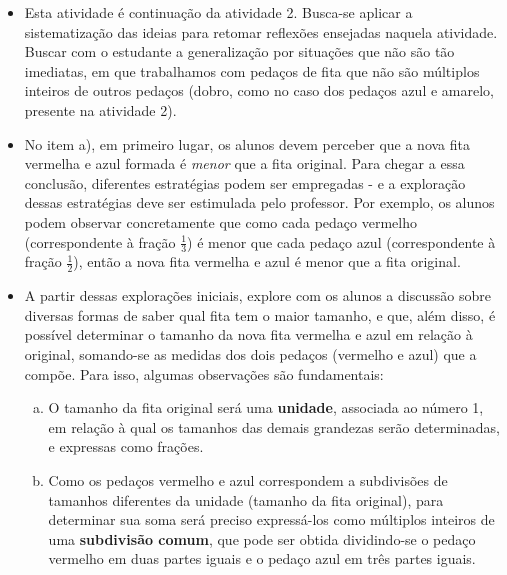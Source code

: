 \begin{multicols}{2}
 \vspace{.15cm}

\begin{itemize} %
  \item     Esta atividade é continuação da atividade 2. Busca-se aplicar a sistematização das ideias para retomar reflexões ensejadas naquela atividade. Buscar com o estudante a generalização por situações que não são tão imediatas, em que trabalhamos com pedaços de fita que não são múltiplos inteiros de outros pedaços (dobro, como no caso dos pedaços azul e amarelo, presente na atividade 2).


   \item  No item a), em primeiro lugar, os alunos devem perceber que a nova fita vermelha e azul formada é {\it menor} que a fita original. Para chegar a essa conclusão, diferentes estratégias podem ser empregadas - e a exploração dessas estratégias deve ser estimulada pelo professor. Por exemplo, os alunos podem observar concretamente que como cada pedaço vermelho (correspondente à fração $\frac{1}{3}$) é menor que cada pedaço azul (correspondente à fração $\frac{1}{2}$), então a nova fita vermelha e azul é menor que a fita original.
  \item  A partir dessas explorações iniciais, explore com os alunos a discussão sobre diversas formas de saber qual fita tem o maior tamanho, e que, além disso, é possível determinar o tamanho da nova fita vermelha e azul em relação à original, somando-se as medidas dos dois pedaços (vermelho e azul) que a compõe. Para isso, algumas observações são fundamentais:
  \begin{enumerate}[a)]
    \item O tamanho da fita original será uma {\bf unidade}, associada ao número 1, em relação à qual os tamanhos das demais grandezas serão determinadas, e expressas como frações.
    \item Como os pedaços vermelho e azul correspondem a subdivisões de tamanhos diferentes da unidade (tamanho da fita original), para determinar sua soma será preciso expressá-los como múltiplos inteiros de uma {\bf subdivisão comum}, que pode ser obtida dividindo-se o pedaço vermelho em duas partes iguais e o pedaço azul em três partes iguais.
 \end{enumerate}


\begin{center}
\end{center}
\end{itemize}
\end{multicols}
